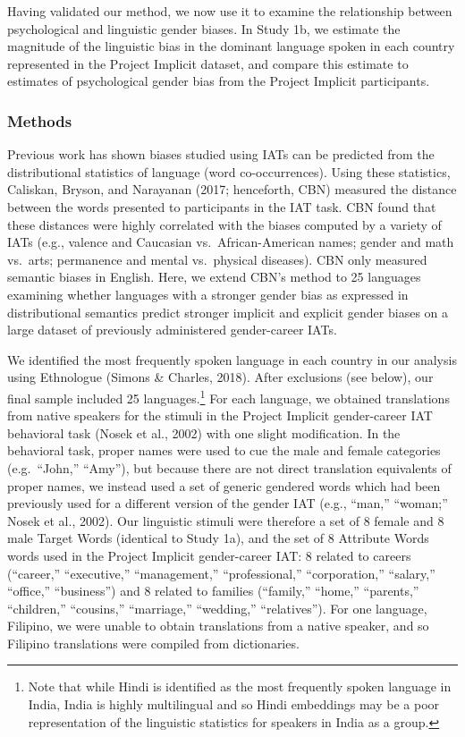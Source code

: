 \documentclass[9pt,twocolumn,twoside,lineno]{pnas-new}
\begin{document}
Having validated our method, we now use it to examine the relationship
between psychological and linguistic gender biases. In Study 1b, we
estimate the magnitude of the linguistic bias in the dominant language
spoken in each country represented in the Project Implicit dataset, and
compare this estimate to estimates of psychological gender bias from the
Project Implicit participants.

\subsubsection*{Methods}\label{methods-1}

Previous work has shown biases studied using IATs can be predicted from
the distributional statistics of language (word co-occurrences). Using
these statistics, Caliskan, Bryson, and Narayanan (2017; henceforth,
CBN) measured the distance between the words presented to participants
in the IAT task. CBN found that these distances were highly correlated
with the biases computed by a variety of IATs (e.g., valence and
Caucasian vs.~African-American names; gender and math vs.~arts;
permanence and mental vs.~physical diseases). CBN only measured semantic
biases in English. Here, we extend CBN's method to 25 languages
examining whether languages with a stronger gender bias as expressed in
distributional semantics predict stronger implicit and explicit gender
biases on a large dataset of previously administered gender-career IATs.

We identified the most frequently spoken language in each country in our
analysis using Ethnologue (Simons \& Charles, 2018). After exclusions
(see below), our final sample included 25
languages.\footnote{Note that while Hindi is identified as the most frequently spoken language in India, India is highly multilingual and so Hindi embeddings may be a poor representation of  the linguistic statistics for speakers in India as a group.}
For each language, we obtained translations from native speakers for the
stimuli in the Project Implicit gender-career IAT behavioral task (Nosek
et al., 2002) with one slight modification. In the behavioral task,
proper names were used to cue the male and female categories
(e.g.~\enquote{John,} \enquote{Amy}), but because there are not direct
translation equivalents of proper names, we instead used a set of
generic gendered words which had been previously used for a different
version of the gender IAT (e.g., ``man,'' ``woman;'' Nosek et al.,
2002). Our linguistic stimuli were therefore a set of 8 female and 8
male Target Words (identical to Study 1a), and the set of 8 Attribute
Words words used in the Project Implicit gender-career IAT: 8 related to
careers (\enquote{career,} \enquote{executive,} \enquote{management,}
\enquote{professional,} \enquote{corporation,} \enquote{salary,}
\enquote{office,} \enquote{business}) and 8 related to families
(\enquote{family,} \enquote{home,} \enquote{parents,}
\enquote{children,} \enquote{cousins,} \enquote{marriage,}
\enquote{wedding,} \enquote{relatives}). For one language, Filipino, we
were unable to obtain translations from a native speaker, and so
Filipino translations were compiled from dictionaries.
\end{document}
